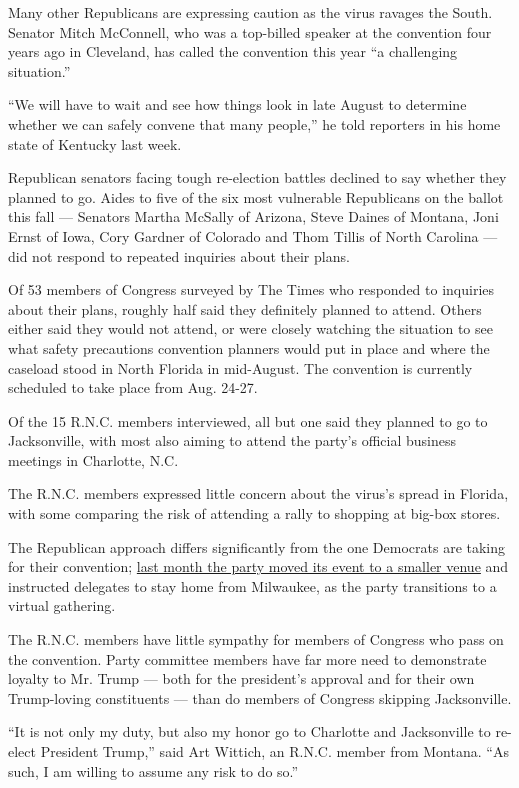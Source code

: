 Many other Republicans are expressing caution as the virus ravages the
South. Senator Mitch McConnell, who was a top-billed speaker at the
convention four years ago in Cleveland, has called the convention this
year ``a challenging situation.''

``We will have to wait and see how things look in late August to
determine whether we can safely convene that many people,'' he told
reporters in his home state of Kentucky last week.

Republican senators facing tough re-election battles declined to say
whether they planned to go. Aides to five of the six most vulnerable
Republicans on the ballot this fall --- Senators Martha McSally of
Arizona, Steve Daines of Montana, Joni Ernst of Iowa, Cory Gardner of
Colorado and Thom Tillis of North Carolina --- did not respond to
repeated inquiries about their plans.

Of 53 members of Congress surveyed by The Times who responded to
inquiries about their plans, roughly half said they definitely planned
to attend. Others either said they would not attend, or were closely
watching the situation to see what safety precautions convention
planners would put in place and where the caseload stood in North
Florida in mid-August. The convention is currently scheduled to take
place from Aug. 24-27.

Of the 15 R.N.C. members interviewed, all but one said they planned to
go to Jacksonville, with most also aiming to attend the party's official
business meetings in Charlotte, N.C.

The R.N.C. members expressed little concern about the virus's spread in
Florida, with some comparing the risk of attending a rally to shopping
at big-box stores.

The Republican approach differs significantly from the one Democrats are
taking for their convention;
\href{https://www.nytimes3xbfgragh.onion/2020/06/24/us/politics/democratic-convention-milwaukee-coronavirus.html}{last
month the party moved its event to a smaller venue} and instructed
delegates to stay home from Milwaukee, as the party transitions to a
virtual gathering.

The R.N.C. members have little sympathy for members of Congress who pass
on the convention. Party committee members have far more need to
demonstrate loyalty to Mr. Trump --- both for the president's approval
and for their own Trump-loving constituents --- than do members of
Congress skipping Jacksonville.

``It is not only my duty, but also my honor go to Charlotte and
Jacksonville to re-elect President Trump,'' said Art Wittich, an R.N.C.
member from Montana. ``As such, I am willing to assume any risk to do
so.''

